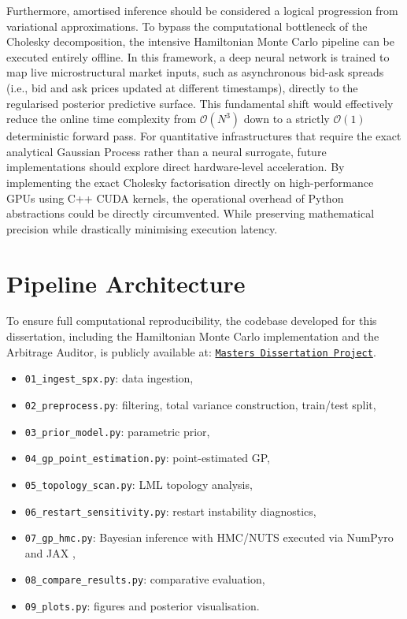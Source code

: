 \documentclass[12pt,oneside]{report}
\theoremstyle{definition}
\theoremstyle{remark}
\begin{document}
Furthermore, amortised inference should be considered a logical progression from variational approximations. To bypass the computational bottleneck of the Cholesky decomposition, the intensive Hamiltonian Monte Carlo pipeline can be executed entirely offline. In this framework, a deep neural network is trained to map live microstructural market inputs, such as asynchronous bid-ask spreads (i.e., bid and ask prices updated at different timestamps), directly to the regularised posterior predictive surface. This fundamental shift would effectively reduce the online time complexity from $\mathcal{O}(N^3)$ down to a strictly $\mathcal{O}(1)$ deterministic forward pass. For quantitative infrastructures that require the exact analytical Gaussian Process rather than a neural surrogate, future implementations should explore direct hardware-level acceleration. By implementing the exact Cholesky factorisation directly on high-performance GPUs using C++ CUDA kernels, the operational overhead of Python abstractions could be directly circumvented. While preserving mathematical precision while drastically minimising execution latency.

\appendix

\chapter{Pipeline Architecture}
To ensure full computational reproducibility, the codebase developed for this dissertation, including the Hamiltonian Monte Carlo implementation and the Arbitrage Auditor, is publicly available at: \href{https://github.com/mishavelial/Masters-Dissertation-Project}{\texttt{Masters Dissertation Project}}.
\begin{itemize}[leftmargin=2em]
    \item \texttt{01\_ingest\_spx.py}: data ingestion,
    \item \texttt{02\_preprocess.py}: filtering, total variance construction, train/test split,
    \item \texttt{03\_prior\_model.py}: parametric prior,
    \item \texttt{04\_gp\_point\_estimation.py}: point-estimated GP,
    \item \texttt{05\_topology\_scan.py}: LML topology analysis,
    \item \texttt{06\_restart\_sensitivity.py}: restart instability diagnostics,
    \item \texttt{07\_gp\_hmc.py}: Bayesian inference with HMC/NUTS \cite{neal2011mcmc, hoffman2014nuts} executed via NumPyro \cite{phan2019numpyro} and JAX \cite{jax2018github},
    \item \texttt{08\_compare\_results.py}: comparative evaluation,
    \item \texttt{09\_plots.py}: figures and posterior visualisation.
\end{itemize}
\end{document}
